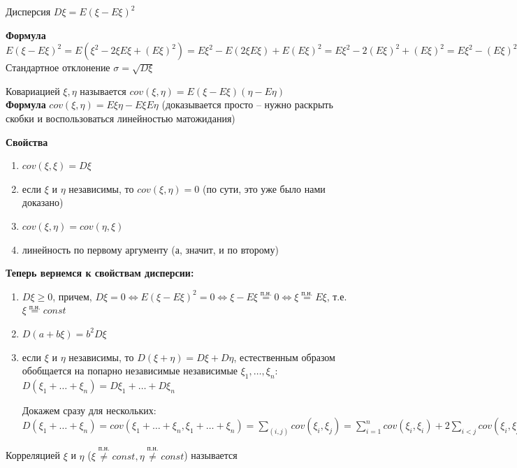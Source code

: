 \Def Дисперсия $D \xi = E(\xi - E\xi)^2$

\textbf{Формула} $E(\xi - E\xi)^2 = E(\xi^2 - 2\xi E\xi + (E\xi)^2) = E\xi^2 - E(2\xi E\xi) + E(E\xi)^2 = E\xi^2 - 2(E\xi)^2 + (E\xi)^2 = E\xi^2 - (E\xi)^2$\\

\Def Стандартное отклонение $\sigma = \sqrt{D\xi}$

\Def Ковариацией $\xi, \eta$ называется $cov(\xi, \eta) = E(\xi - E\xi)(\eta - E\eta)$\\

\textbf{Формула} $cov(\xi, \eta) = E\xi\eta - E\xi E\eta$ (доказывается просто -- нужно раскрыть скобки и воспользоваться линейностью матожидания)

\textbf{Свойства}
\begin{enumerate}
    \item $cov(\xi, \xi) = D\xi$
    \item если $\xi$ и $\eta$ независимы, то $cov(\xi, \eta) = 0$ (по сути, это уже было нами доказано)
    \item $cov(\xi, \eta) = cov(\eta, \xi)$
    \item линейность по первому аргументу (а, значит, и по второму)
\end{enumerate}

\textbf{Теперь вернемся к свойствам дисперсии:}
\begin{enumerate}
    \item $D\xi \geq 0$, причем, $D\xi = 0 \Longleftrightarrow E(\xi - E\xi)^2 = 0 \Longleftrightarrow \xi - E\xi \stackrel{\mbox{п.н.}}{=} 0 \Longleftrightarrow \xi \stackrel{\mbox{п.н.}}{=} E\xi$, т.е. $\xi \stackrel{\mbox{п.н.}}{=} const$
    \item $D(a + b\xi) = b^2D\xi$
    \item если $\xi$ и $\eta$ независимы, то $D(\xi + \eta) = D\xi + D\eta$, естественным образом обобщается на попарно независимые независимые $\xi_1, \dots, \xi_n$: $D(\xi_1 + \dots + \xi_n) = D\xi_1 + \dots + D\xi_n$
    
    \Proof
    Докажем сразу для нескольких:
    $D(\xi_1 + \dots + \xi_n) = cov(\xi_1 + \dots + \xi_n, \xi_1 + \dots + \xi_n) = \sum\limits_{(i, j)}cov(\xi_i, \xi_j) = \sum\limits_{i=1}^ncov(\xi_i, \xi_i) + 2\sum\limits_{i<j}cov(\xi_i, \xi_j) = \sum\limits_{i=1}^nD\xi_i$
    \EndProof
\end{enumerate}

\Def Корреляцией $\xi$ и $\eta$ ($\xi \stackrel{\mbox{п.н.}}{\neq} const, \eta \stackrel{\mbox{п.н.}}{\neq} const$) называется 

